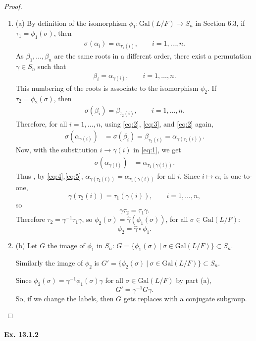 \documentclass[11pt,a4paper]{article}
\newcommand{\be} {\begin{enumerate}}
\newcommand{\ee} {\end{enumerate}}
\newcommand{\Gal}{\mathrm{Gal}}
\begin{document}
\begin{proof}
\be
\item[(a)]
By definition of the isomorphism $\phi_1 : \Gal(L/F) \to S_n$ in Section 6.3, if $\tau_1 = \phi_1(\sigma)$, then 
\begin{align}
\sigma(\alpha_i) = \alpha_{\tau_1(i)},\qquad i=1,\ldots,n.\label{eq:1}
\end{align}
As $\beta_1,\ldots,\beta_n$ are the same roots in a different order, there exist a permutation $\gamma \in S_n$ such that
\begin{align}
\beta_i = \alpha_{\gamma(i)},\qquad i=1,\ldots,n.\label{eq:2}
\end{align}
This numbering of the roots is associate to the isomorphism $\phi_2$. If $\tau_2 = \phi_2(\sigma)$, then 
\begin{align}
\sigma(\beta_i) = \beta_{\tau_2(i)}, \qquad i=1,\ldots,n.\label{eq:3}
\end{align}
Therefore, for all $i=1,\ldots,n$, using \eqref{eq:2}, \eqref{eq:3}, and \eqref{eq:2} again,
\begin{align}
\sigma(\alpha_{\gamma(i)} )&= \sigma(\beta_i)  = \beta_{\tau_2(i)} = \alpha_{\gamma(\tau_2(i))}.\label{eq:4}
\end{align}
Now, with the substitution $i \to \gamma(i)$ in \eqref{eq:1}, we get
\begin{align}
\sigma(\alpha_{\gamma(i)}) &= \alpha_{\tau_1(\gamma(i))}.\label{eq:5}
\end{align}
Thus , by \eqref{eq:4},\eqref{eq:5}, $\alpha_{\gamma(\tau_2(i))} = \alpha_{\tau_1(\gamma(i))}$ for all $i$. Since $i \mapsto \alpha_i$ is one-to-one,
$$\gamma(\tau_2(i)) = \tau_1(\gamma(i)),\qquad i=1,\ldots,n,$$
so
$$\gamma  \tau_2 = \tau_1 \gamma.$$
Therefore $\tau_2 = \gamma^{-1} \tau_1 \gamma$, so  $\phi_2(\sigma) = \hat{\gamma}(\phi_1(\sigma))$, for all $\sigma \in \Gal(L/F)$:
$$\phi_2 = \hat{\gamma} \circ \phi_1.$$
\item[(b)] Let $G$ the image of $\phi_1$ in $S_n$: $G = \{\phi_1(\sigma)\ | \ \sigma \in \Gal(L/F)\} \subset S_n$. 

Similarly the image of $\phi_2$ is $G' = \{\phi_2(\sigma)\ | \ \sigma \in \Gal(L/F)\} \subset S_n$. 

Since $\phi_2(\sigma) = \gamma^{-1} \phi_1(\sigma) \gamma$ for all $\sigma \in \Gal(L/F)$ by part (a),
$$G' = \gamma^{-1} G \gamma.$$
So, if we change the labels, then $G$ gets replaces with a conjugate subgroup.
\ee
\end{proof}

\paragraph{Ex. 13.1.2}
\end{document}
